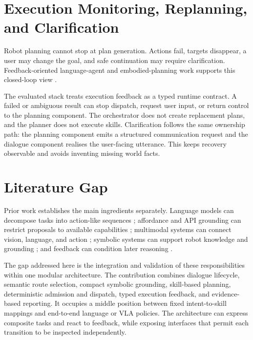 \section{Execution Monitoring, Replanning, and Clarification}

Robot planning cannot stop at plan generation. Actions fail, targets disappear, a user may change the goal, and safe continuation may require clarification. Feedback-oriented language-agent and embodied-planning work supports this closed-loop view \parencite{huang2022innermonologue,yao2022react,shinn2023reflexion}.

The evaluated stack treats execution feedback as a typed runtime contract. A failed or ambiguous result can stop dispatch, request user input, or return control to the planning component. The orchestrator does not create replacement plans, and the planner does not execute skills. Clarification follows the same ownership path: the planning component emits a structured communication request and the dialogue component realises the user-facing utterance. This keeps recovery observable and avoids inventing missing world facts.

\section{Literature Gap}

Prior work establishes the main ingredients separately. Language models can decompose tasks into action-like sequences \parencite{huang2022zeroshot}; affordance and API grounding can restrict proposals to available capabilities \parencite{ahn2022saycan,liang2022codepolicies}; multimodal systems can connect vision, language, and action \parencite{driess2023palme,brohan2023rt2,kim2024openvla}; symbolic systems can support robot knowledge and grounding \parencite{tenorth2013knowrob,saxena2014robobrain}; and feedback can condition later reasoning \parencite{huang2022innermonologue,yao2022react}.

The gap addressed here is the integration and validation of these responsibilities within one modular architecture. The contribution combines dialogue lifecycle, semantic route selection, compact symbolic grounding, skill-based planning, deterministic admission and dispatch, typed execution feedback, and evidence-based reporting. It occupies a middle position between fixed intent-to-skill mappings and end-to-end language or VLA policies. The architecture can express composite tasks and react to feedback, while exposing interfaces that permit each transition to be inspected independently.

